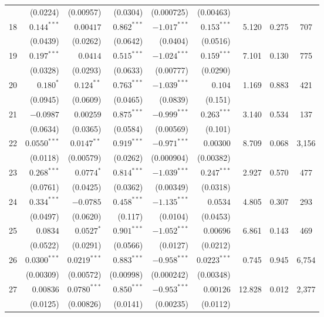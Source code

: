 \documentclass[11pt,a4paper]{article}
\begin{document}
\begin{landscape}
\begin{longtable}{crrrrrrrc}
   & (0.0224) & (0.00957) & (0.0304) & (0.000725) & (0.00463) & & & \\
18 & $0.144^{***}$ & $0.00417$ & $0.862^{***}$ & $-1.017^{***}$ & $0.153^{***}$ & 5.120 & 0.275 & 707 \\
   & (0.0439) & (0.0262) & (0.0642) & (0.0404) & (0.0516) & & & \\
19 & $0.197^{***}$ & $0.0414$ & $0.515^{***}$ & $-1.024^{***}$ & $0.159^{***}$ & 7.101 & 0.130 & 775 \\
   & (0.0328) & (0.0293) & (0.0633) & (0.00777) & (0.0290) & & & \\
20 & $0.180^{*}$ & $0.124^{**}$ & $0.763^{***}$ & $-1.039^{***}$ & $0.104$ & 1.169 & 0.883 & 421 \\
   & (0.0945) & (0.0609) & (0.0465) & (0.0839) & (0.151) & & & \\
21 & $-0.0987$ & $0.00259$ & $0.875^{***}$ & $-0.999^{***}$ & $0.263^{***}$ & 3.140 & 0.534 & 137 \\
   & (0.0634) & (0.0365) & (0.0584) & (0.00569) & (0.101) & & & \\
22 & $0.0550^{***}$ & $0.0147^{**}$ & $0.919^{***}$ & $-0.971^{***}$ & $0.00300$ & 8.709 & 0.068 & 3{,}156 \\
   & (0.0118) & (0.00579) & (0.0262) & (0.000904) & (0.00382) & & & \\
23 & $0.268^{***}$ & $0.0774^{*}$ & $0.814^{***}$ & $-1.039^{***}$ & $0.247^{***}$ & 2.927 & 0.570 & 477 \\
   & (0.0761) & (0.0425) & (0.0362) & (0.00349) & (0.0318) & & & \\
24 & $0.334^{***}$ & $-0.0785$ & $0.458^{***}$ & $-1.135^{***}$ & $0.0534$ & 4.805 & 0.307 & 293 \\
   & (0.0497) & (0.0620) & (0.117) & (0.0104) & (0.0453) & & & \\
25 & $0.0834$ & $0.0527^{*}$ & $0.901^{***}$ & $-1.052^{***}$ & $0.00696$ & 6.861 & 0.143 & 469 \\
   & (0.0522) & (0.0291) & (0.0566) & (0.0127) & (0.0212) & & & \\
26 & $0.0300^{***}$ & $0.0219^{***}$ & $0.883^{***}$ & $-0.958^{***}$ & $0.0223^{***}$ & 0.745 & 0.945 & 6{,}754 \\
   & (0.00309) & (0.00572) & (0.00998) & (0.000242) & (0.00348) & & & \\
27 & $0.00836$ & $0.0780^{***}$ & $0.850^{***}$ & $-0.953^{***}$ & $0.00126$ & 12.828 & 0.012 & 2{,}377 \\
   & (0.0125) & (0.00826) & (0.0141) & (0.00235) & (0.0112) & & & \\

\end{longtable}
\end{landscape}
\end{document}
